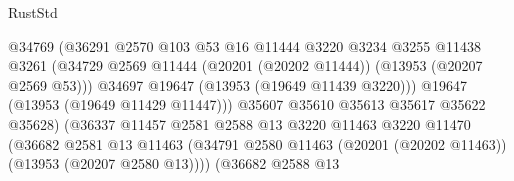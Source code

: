\begin{lexlean}{RustStd}
\begin{coremodule}
                                            @34769
                                            (@36291
                                              @2570
                                              @103
                                              @53
                                              @16
                                              @11444
                                              @3220
                                              @3234
                                              @3255
                                              @11438
                                              @3261
                                              (@34729
                                                @2569
                                                @11444
                                                (@20201 (@20202 @11444))
                                                (@13953 (@20207 @2569 @53)))
                                              @34697
                                              @19647
                                              (@13953 (@19649 @11439 @3220)))
                                            @19647
                                            (@13953 (@19649 @11429 @11447)))
                                          @35607
                                          @35610
                                          @35613
                                          @35617
                                          @35622
                                          @35628)
                                        (@36337
                                          @11457
                                          @2581
                                          @2588
                                          @13
                                          @3220
                                          @11463
                                          @3220
                                          @11470
                                          (@36682
                                            @2581
                                            @13
                                            @11463
                                            (@34791
                                              @2580
                                              @11463
                                              (@20201 (@20202 @11463))
                                              (@13953 (@20207 @2580 @13))))
                                          (@36682
                                            @2588
                                            @13

\end{coremodule}
\end{lexlean}
